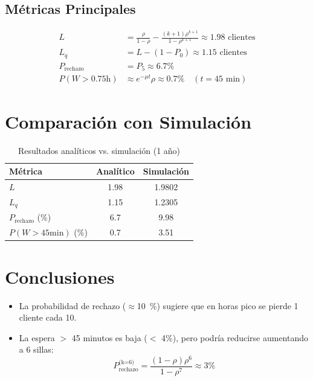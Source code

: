 \documentclass{article}
\begin{document}
\subsection{Métricas Principales}
\begin{align*}
    L &= \frac{\rho}{1 - \rho} - \frac{(k+1)\rho^{k+1}}{1 - \rho^{k+1}} \approx 1.98 \text{ clientes} \\
    L_q &= L - (1 - P_0) \approx 1.15 \text{ clientes} \\
    P_{\text{rechazo}} &= P_5 \approx 6.7\% \\
    P(W > 0.75\text{h}) &\approx e^{-\mu t}\rho \approx 0.7\% \quad (t=45\text{ min})
\end{align*}

\section{Comparación con Simulación}
\begin{table}[H]
    \centering
    \caption{Resultados analíticos vs. simulación (1 año)}
    \begin{tabular}{lSS}
        \toprule
        Métrica & {Analítico} & {Simulación} \\
        \midrule
        $L$ & 1.98 & 1.9802 \\
        $L_q$ & 1.15 & 1.2305 \\
        $P_{\text{rechazo}}$ (\%) & 6.7 & 9.98 \\
        $P(W > 45\text{min})$ (\%) & 0.7 & 3.51 \\
        \bottomrule
    \end{tabular}
\end{table}

\section{Conclusiones}
\begin{itemize}
    \item La probabilidad de rechazo ($\approx$\SI{10}{\%}) sugiere que en horas pico se pierde 1 cliente cada 10.
    \item La espera $>$ 45 minutos es baja ($<$ 4\%), pero podría reducirse aumentando a 6 sillas:
    \[
    P_{\text{rechazo}}^{\text{(k=6)}} = \frac{(1-\rho)\rho^6}{1-\rho^{7}} \approx 3\%
    \]
\end{itemize}
\end{document}
